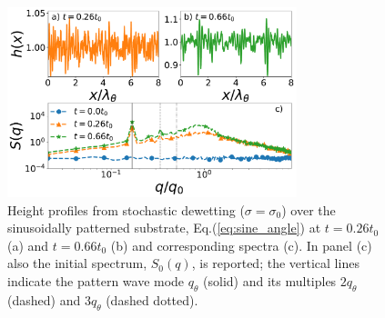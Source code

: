 \begin{figure}
    \centering
    \includegraphics[width=0.75\textwidth]{graphics/psd_spacedepCA_sine_25_10_1e-7_[0, 450000, 1150000]_9_3_rescaled.pdf}
    \caption{Height profiles from stochastic dewetting ($\sigma=\sigma_0$) over the sinusoidally patterned substrate, Eq.(\ref{eq:sine_angle}) at $t=0.26 t_0$ (a) and $t=0.66 t_0$ (b) and corresponding spectra (c).  
    In panel (c) also the initial spectrum, $S_0(q)$, is reported; the vertical lines indicate the pattern wave mode $q_{\theta}$ (solid) and its multiples $2q_{\theta}$ (dashed) and $3q_{\theta}$ (dashed dotted).}
    \label{fig:spectral_analysis_stoch_sine8}
\end{figure}

